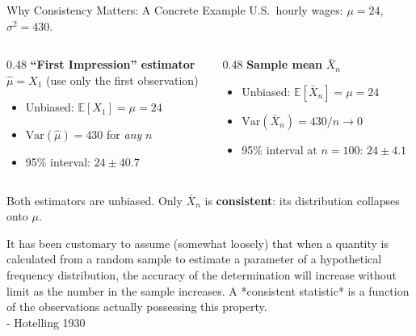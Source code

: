\documentclass[handout, aspectratio=169]{beamer}
\numberwithin{equation}{section}
\begin{document}
\begin{frame}{Why Consistency Matters: A Concrete Example}
U.S.\ hourly wages: $\mu = 24$, $\sigma^2 = 430$.

\begin{columns}[T]
\begin{column}{0.48\textwidth}
\textbf{``First Impression'' estimator}\\
$\hat{\mu} = X_1$ (use only the first observation)
\begin{itemize}
\item Unbiased: $\mathbb{E}[X_1] = \mu = 24$
\item $\text{Var}(\hat{\mu}) = 430$ for \emph{any} $n$
\item 95\% interval: $24 \pm 40.7$
\end{itemize}
\end{column}
\begin{column}{0.48\textwidth}
\textbf{Sample mean} $\bar{X}_n$
\begin{itemize}
\item Unbiased: $\mathbb{E}[\bar{X}_n] = \mu = 24$
\item $\text{Var}(\bar{X}_n) = 430/n \to 0$
\item 95\% interval at $n=100$: $24 \pm 4.1$
\end{itemize}
\end{column}
\end{columns}

\pause

\begin{tcolorbox}[colback=blue!5, colframe=blue!50]
Both estimators are unbiased. Only $\bar{X}_n$ is \textbf{consistent}: its distribution collapses onto $\mu$.
\end{tcolorbox}
\end{frame}


\begin{frame}

It has been customary to assume (somewhat loosely) that when a quantity is calculated from a random sample to estimate a parameter of a hypothetical frequency distribution, the accuracy of the determination will increase without limit as the number in the sample increases. A *consistent statistic* is a function of the observations actually possessing this property. \\
\hfill - Hotelling 1930


\end{frame}
\end{document}
